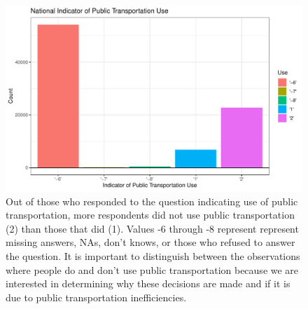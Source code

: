 \documentclass{article}
\begin{document}
\begin{figure}[H]
\centering
\includegraphics{Thesis_Proposal-009}
\caption{Out of those who responded to the question indicating use of public transportation, more respondents did not use public transportation (2) than those that did (1). Values -6 through -8 represent represent missing answers, NAs, don't knows, or those who refused to answer the question. It is important to distinguish between the observations where people do and don't use public transportation because we are interested in determining why these decisions are made and if it is due to public transportation inefficiencies.}
\label{Figure 8}
\end{figure}
\end{document}
